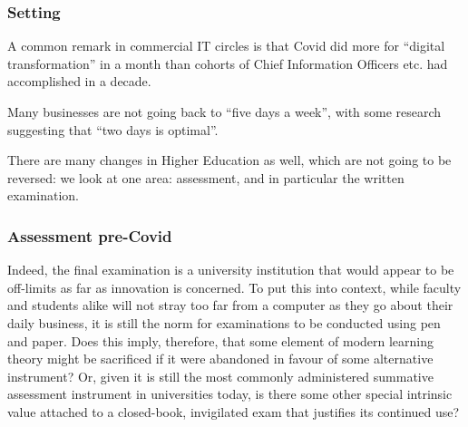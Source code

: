 \frame{
\titlepage
}
\begin{frame}[fragile]
\frametitle{Setting}
\pause
A common remark in commercial IT circles is that Covid did more for ``digital transformation'' in a month than cohorts of Chief  Information Officers etc. had accomplished in a decade. 
\pause\par
 Many businesses are not going back to ``five days a week'', with some research \cite{Bindley2022a} suggesting that ``two days is optimal''.
\par\pause
There are many changes in Higher Education as well, which are not going to be reversed: we look at one area: assessment, and in particular the written examination.
\end{frame}
\begin{frame}[fragile]
\frametitle{Assessment pre-Covid}
\pause
Indeed, the final examination is a university institution that would appear to be off-limits as far as innovation is concerned. To put this into context, while faculty and students alike will not stray too far from a computer as they go about their daily business, it is still the norm for examinations to be conducted using pen and paper. Does this imply, therefore, that some element of modern learning theory might be sacrificed if it were abandoned in favour of some alternative instrument? Or, given it is still the most commonly administered summative assessment instrument in universities today, is there some other special intrinsic value attached to a closed-book, invigilated exam that justifies its continued use?
\cite{WilliamsWong2009a}
\end{frame}
